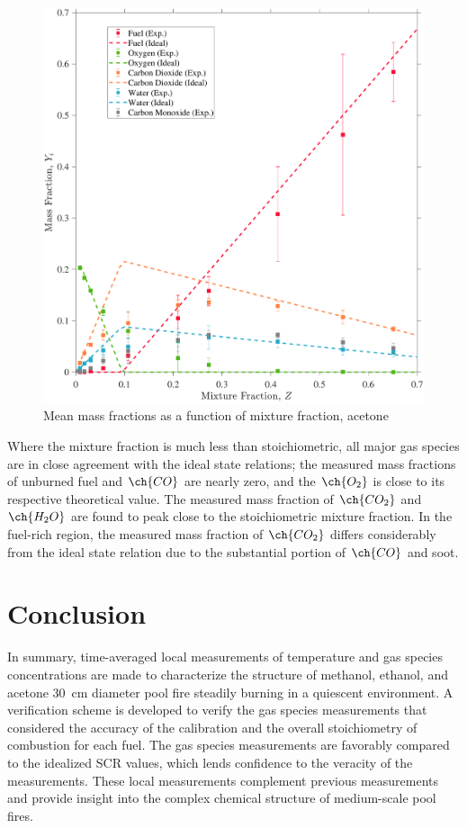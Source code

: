 \documentclass[12pt]{article}
\begin{document}
\begin{figure}[!]
	\centering
\includegraphics[width=\textwidth,keepaspectratio]{Adjusted_FuelAcetone_Mixture_Fraction_Intermediate_Plot.pdf}
	\caption[Mean mass fractions as a function of mixture fraction, acetone]{Mean mass fractions as a function of mixture fraction, acetone}
	\label{fig:Acetone_Mix_Frac}
\end{figure}

Where the mixture fraction is much less than stoichiometric, all major gas species are in close agreement with the ideal state relations; the measured mass fractions of unburned fuel and $\ch{CO}$ are nearly zero, and the $\ch{O_2}$ is close to its respective theoretical value. The measured mass fraction of $\ch{CO_{2}}$ and $\ch{H_{2}O}$ are found to peak close to the stoichiometric mixture fraction. In the fuel-rich region, the measured mass fraction of $\ch{CO_{2}}$ differs considerably from the ideal state relation due to the substantial portion of $\ch{CO}$ and soot.


\clearpage

\section{Conclusion}
\label{sec:Conclusion}
In summary, time-averaged local measurements of temperature and gas species concentrations are made to characterize the structure of methanol, ethanol, and acetone \SI{30}{cm} diameter pool fire steadily burning in a quiescent environment. A verification scheme is developed to verify the gas species measurements that considered  the accuracy of the calibration and the overall stoichiometry of combustion for each fuel. The gas species measurements are favorably compared to the idealized SCR values, which lends confidence to the veracity of the measurements. These local measurements complement previous measurements and provide insight into the complex chemical structure of medium-scale pool fires.
\end{document}
